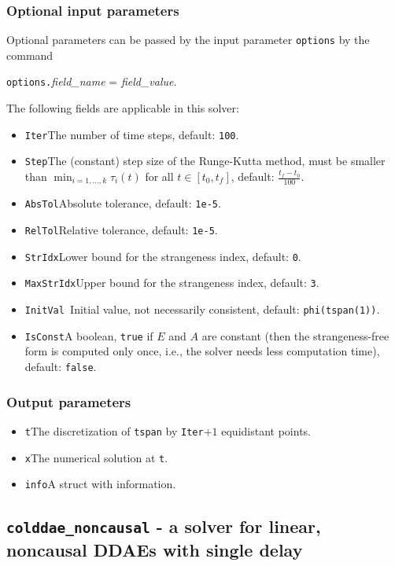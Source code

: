 \documentclass[final,reqno]{siamltex}
\begin{document}
\subsubsection{Optional input parameters}
Optional parameters can be passed by the input parameter {\tt options} by the command 
\begin{center}
{\tt options.}{\it field\_name} = {\it field\_value}.
\end{center}
The following fields are applicable in this solver:
\begin{itemize}
\item {\tt Iter}\quad        The number of time steps, default: {\tt 100}.
\item {\tt Step}\quad        The (constant) step size of the Runge-Kutta method, must be smaller than
          $\min_{i=1,\ldots,k}\tau_i(t)$ for all $t\in[t_0,t_f]$, default: $\frac{t_f-t_0}{100}$.
\item {\tt AbsTol}\quad       Absolute tolerance, default:  {\tt 1e-5}.
\item {\tt RelTol}\quad       Relative tolerance, default:  {\tt 1e-5}.
\item {\tt StrIdx}\quad       Lower bound for the strangeness index,  default: {\tt 0}.
\item {\tt MaxStrIdx}\quad    Upper bound for the strangeness index,  default: {\tt 3}.
\item {\tt InitVal  }\quad    Initial value, not necessarily consistent,  default: {\tt phi(tspan(1))}.
\item {\tt IsConst}\quad      A boolean, {\tt true} if $E$ and $A$ are constant (then the strangeness-free form is computed only once, i.e.,  the solver needs less computation time), default: {\tt false}.
\end{itemize}

\subsubsection{Output parameters}
\begin{itemize}
\item {\tt t}\quad The discretization of {\tt tspan} by {\tt Iter}$+1$ equidistant points.
\item {\tt x}\quad The numerical solution at {\tt t}.
\item {\tt info}\quad A struct with information.
\end{itemize}


\subsection{{\tt colddae\_noncausal} - a solver for linear, noncausal DDAEs with single delay}
\end{document}
